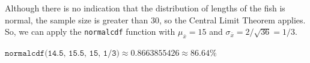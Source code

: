 \documentclass{article}
\newcommand{\answer}[1]{\color{red}#1}
\begin{document}
\begin{enumerate}
{\answer Although there is no indication that the distribution of lengths of the fish is normal, the sample size is greater than 30, so the Central Limit Theorem applies.  So, we can apply the \texttt{normalcdf} function with $\mu_{\bar{x}}=15$ and $\sigma_{\bar{x}} = 2/\sqrt{36} = 1/3$. 

$\texttt{normalcdf(14.5, 15.5, 15, 1/3)} \approx 0.8663855426 \approx 86.64\%$
} 

\end{enumerate}
\end{document}

